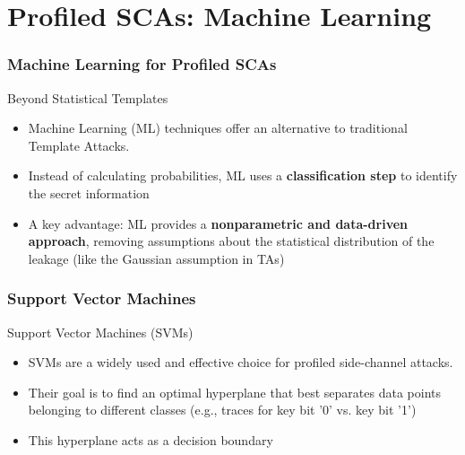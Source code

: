 \section{Profiled SCAs: Machine Learning} %

\begin{frame}
    \frametitle{Machine Learning for Profiled SCAs}
    \begin{block}{Beyond Statistical Templates}
        \begin{itemize}
            \item Machine Learning (ML) techniques offer an alternative to traditional Template Attacks.
            \item Instead of calculating probabilities, ML uses a \textbf{classification step} to identify the secret information
            \item A key advantage: ML provides a \textbf{nonparametric and data-driven approach}, removing assumptions about the statistical distribution of the leakage (like the Gaussian assumption in TAs)
        \end{itemize}
    \end{block}
\end{frame}
\begin{frame}
\frametitle{Support Vector Machines}
    \begin{block}{Support Vector Machines (SVMs)}
        \begin{itemize}
            \item SVMs are a widely used and effective choice for profiled side-channel attacks.
            \item Their goal is to find an optimal hyperplane that best separates data points belonging to different classes (e.g., traces for key bit '0' vs. key bit '1')
            \item This hyperplane acts as a decision boundary
        \end{itemize}
    \end{block}
\end{frame}

